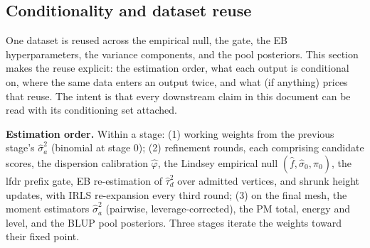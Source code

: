 \documentclass[11pt]{article}
\begin{document}
\subsection{Conditionality and dataset reuse}\label{sec:conditionality}

One dataset is reused across the empirical null, the gate, the EB
hyperparameters, the variance components, and the pool posteriors. This
section makes the reuse explicit: the estimation order, what each output is
conditional on, where the same data enters an output twice, and what (if
anything) prices that reuse. The intent is that every downstream claim in
this document can be read with its conditioning set attached.

\medskip
\noindent\textbf{Estimation order.} Within a stage: (1) working weights from
the previous stage's $\hat\sigma_a^2$ (binomial at stage 0); (2) refinement
rounds, each comprising candidate scores, the dispersion calibration
$\hat\varphi$, the Lindsey empirical null $(\hat f,\hat\sigma_0,\hat\pi_0)$,
the lfdr prefix gate, EB re-estimation of $\hat\tau_d^2$ over admitted
vertices, and shrunk height updates, with IRLS re-expansion every third round;
(3) on the final mesh, the moment estimators $\hat\sigma_a^2$ (pairwise,
leverage-corrected), the PM total, energy and level, and the BLUP pool
posteriors. Three stages iterate the weights toward their fixed point.
\end{document}
